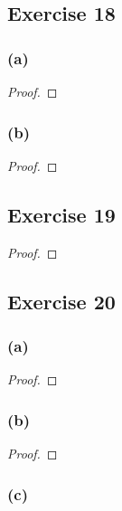 \documentclass[14pt]{extarticle}
\begin{document}
\subsection{Exercise 18}

\subsubsection{(a)}

\begin{proof}

\end{proof}

\subsubsection{(b)}

\begin{proof}

\end{proof}

\subsection{Exercise 19}

\begin{proof}

\end{proof}

\subsection{Exercise 20}

\subsubsection{(a)}

\begin{proof}

\end{proof}

\subsubsection{(b)}

\begin{proof}

\end{proof}

\subsubsection{(c)}
\end{document}

